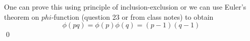 
One can prove this using principle of inclusion-exclusion or we can use
Euler's theorem on $phi$-function (question 23 or from class notes) to obtain
\[
\phi(pq) = \phi(p) \phi(q) = (p-1)(q-1)
\]
\qed
